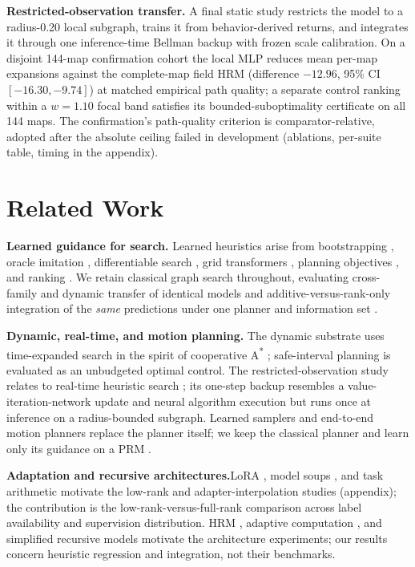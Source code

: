 \documentclass[letterpaper]{article} %
\begin{document}
\textbf{Restricted-observation transfer.} A final static study restricts the model to a radius-0.20 local subgraph, trains it from behavior-derived returns, and integrates it through one inference-time Bellman backup with frozen scale calibration. On a disjoint 144-map confirmation cohort the local MLP reduces mean per-map expansions against the complete-map field HRM (difference $-12.96$, 95\% CI $[-16.30,-9.74]$) at matched empirical path quality; a separate control ranking within a $w{=}1.10$ focal band satisfies its bounded-suboptimality certificate on all 144 maps. The confirmation's path-quality criterion is comparator-relative, adopted after the absolute ceiling failed in development (ablations, per-suite table, timing in the appendix).
\section{Related Work}

 \textbf{Learned guidance for search.} Learned heuristics arise from bootstrapping \citep{arfaee2011bootstrap}, oracle imitation \citep{bhardwaj2017sail}, differentiable search \citep{yonetani2021neuralastar}, grid transformers \citep{kirilenko2023transpath}, planning objectives \citep{ferber2020neural}, and ranking \citep{chrestien2023rank}. We retain classical graph search throughout, evaluating cross-family and dynamic transfer of identical models and additive-versus-rank-only integration of the \emph{same} predictions under one planner and information set \citep{pohl1970,pearl1982semiadmissible,aine2016mha}.

 \textbf{Dynamic, real-time, and motion planning.} The dynamic substrate uses time-expanded search in the spirit of cooperative A\textsuperscript{*} \citep{silver2005cooperative}; safe-interval planning \citep{phillips2011sipp} is evaluated as an unbudgeted optimal control. The restricted-observation study relates to real-time heuristic search \citep{korf1990rta,koenig2006rtaa}; its one-step backup resembles a value-iteration-network update \citep{tamar2016vin,lee2018gppn} and neural algorithm execution \citep{velickovic2021nar} but runs once at inference on a radius-bounded subgraph. Learned samplers and end-to-end motion planners \citep{ichter2018sampling,qureshi2019mpnet} replace the planner itself; we keep the classical planner and learn only its guidance on a PRM \citep{kavraki1996prm}.

 \textbf{Adaptation and recursive architectures.}\hspace{0.25em}LoRA \citep{hu2021lora}, model soups \citep{wortsman2022soups}, and task arithmetic \citep{ilharco2022task} motivate the low-rank and adapter-interpolation studies (appendix); the contribution is the low-rank-versus-full-rank comparison across label availability and supervision distribution. HRM \citep{wang2025hrm}, adaptive computation \citep{graves2016act,banino2021pondernet}, and simplified recursive models \citep{jolicoeur2025trm} motivate the architecture experiments; our results concern heuristic regression and integration, not their benchmarks.
\end{document}
